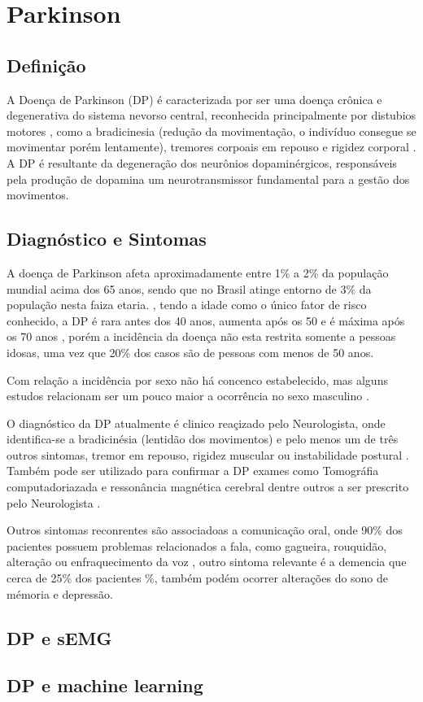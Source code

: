 \chapter{Parkinson}
\section{Definição}
A Doença de Parkinson (DP) é caracterizada por ser uma doença crônica e degenerativa do sistema nevorso central, reconhecida principalmente por distubios motores \cite{souzametodos}, como a bradicinesia (redução da movimentação, o indivíduo consegue se movimentar porém lentamente), tremores corpoais em repouso e rigidez corporal \cite{da2016aspectos}. A DP é resultante da degeneração dos neurônios dopaminérgicos, responsáveis pela produção de dopamina um neurotransmissor fundamental para a gestão dos movimentos. 

\section{Diagnóstico e Sintomas}
A doença de Parkinson afeta aproximadamente entre 1\% a 2\% da população mundial acima dos 65 anos, sendo que no Brasil atinge entorno de 3\% da população nesta faiza etaria. \cite{magalhaes2009descobrindo}, tendo a idade como o único fator de risco conhecido, a DP é rara antes dos 40 anos, aumenta após os 50 e é máxima após os 70 anos \cite{peixinho2006alteraccoes}, porém a incidência da doença não esta restrita somente a pessoas idosas, uma vez que 20\% dos casos são de pessoas com menos de 50 anos. \cite{gago2014manual}

Com relação a incidência por sexo não há concenco estabelecido, mas alguns estudos relacionam ser um pouco maior a ocorrência no sexo masculino \cite{peixinho2006alteraccoes}.

O diagnóstico da DP atualmente é clinico reaçizado pelo Neurologista, onde identifica-se a bradicinésia (lentidão dos movimentos) e pelo menos um de três outros sintomas, tremor em repouso, rigidez muscular ou instabilidade postural \cite{gago2014manual}. Também pode ser utilizado para confirmar a DP exames como Tomográfia computadoriazada e ressonância magnética cerebral dentre outros a ser prescrito pelo Neurologista \cite{gago2014manual}.

Outros sintomas reconrentes são associadoas a comunicação oral, onde 90\% dos pacientes possuem problemas relacionados a fala, como gagueira, rouquidão, alteração ou enfraquecimento da voz \cite{zarzur2010laryngeal}, outro sintoma relevante é a demencia que cerca de 25\% dos pacientes \cite{pamplona1996demencia}\%, também podém ocorrer alterações do sono de mémoria e depressão\cite{barbosa2005parkinsons}.

\section{DP e sEMG}


\section{DP e machine learning}